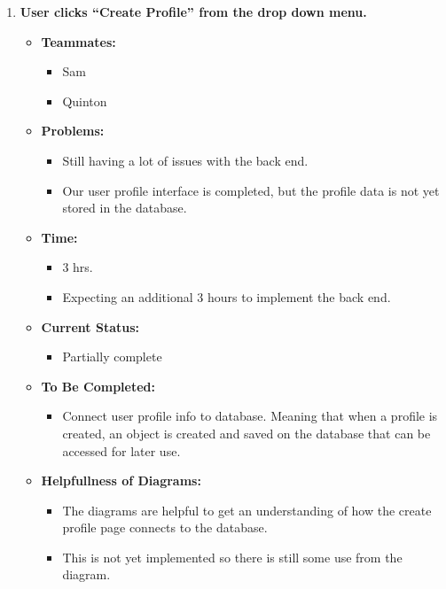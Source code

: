 \documentclass[12pt]{article}
\begin{document}
\begin{enumerate}
    \item \textbf{User clicks “Create Profile” from the drop down menu.}
      \begin{itemize}
        \item \textbf{Teammates:}
          \begin{itemize}
            \item Sam
            \item Quinton
          \end{itemize}
        \item \textbf{Problems:}
          \begin{itemize}
            \item Still having a lot of issues with the back end.
            \item Our user profile interface is completed, but the profile data is not yet stored in the database.
          \end{itemize}
        \item \textbf{Time:}
          \begin{itemize}
            \item 3 hrs.
            \item Expecting an additional 3 hours to implement the back end.
          \end{itemize}
        \item \textbf{Current Status:}
          \begin{itemize}
            \item Partially complete
          \end{itemize}
        \item \textbf{To Be Completed:}
          \begin{itemize}
            \item Connect user profile info to database. Meaning that when a profile is created, an object is created and saved on the database that can be accessed for later use.
          \end{itemize}
        \item \textbf{Helpfullness of Diagrams:}
          \begin{itemize}
            \item The diagrams are helpful to get an understanding of how the create profile page connects to the database.
            \item This is not yet implemented so there is still some use from the diagram.
          \end{itemize}
      \end{itemize}


\end{enumerate}
\end{document}
